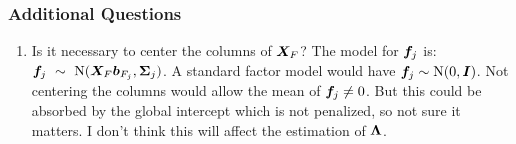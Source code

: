 \documentclass[11pt]{amsart}
\newcommand*{\B}[1]{\ifmmode\bm{#1}\else\textbf{#1}\fi}
\begin{document}
\subsubsection{Additional Questions}
\begin{enumerate}
\item Is it necessary to center the columns of $\B{X}_F$? The model for $\B{f}_j$ is: $\B{f}_j~\sim~\mbox{N}(\B{X}_F\B{b}_{F_j},\B{\Sigma}_j)$. A standard factor model would have $\B{f}_j \sim \mbox{N}(0,\B{I})$. Not centering the columns would allow the mean of $\B{f}_j \neq 0$. But this could be absorbed by the global intercept which is not penalized, so not sure it matters. I don't think this will affect the estimation of $\B{\Lambda}$.
\end{enumerate}
\end{document}
